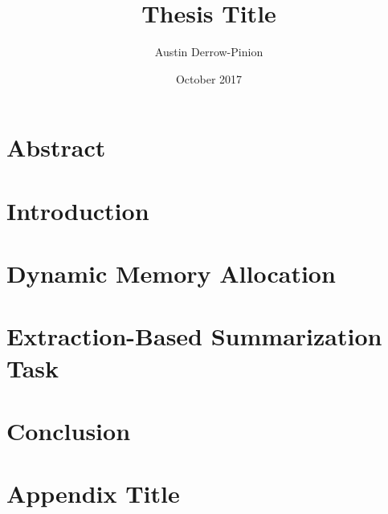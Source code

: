 \documentclass[12pt]{report}
\title{Thesis Title}
\author{Austin Derrow-Pinion}
\date{October 2017}
\begin{document}


\chapter*{Abstract}


\tableofcontents

\chapter{Introduction}


\chapter{Dynamic Memory Allocation}


\chapter{Extraction-Based Summarization Task}


\chapter{Conclusion}


\appendix
\chapter{Appendix Title}


\printbibliography
\end{document}
